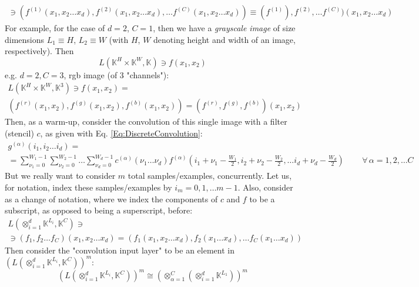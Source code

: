 \documentclass[10pt]{amsart}
\begin{document}
\begin{multicols*}{2}
\begin{equation}
\begin{gathered}
\ni (f^{(1)}(x_1,x_2 \dots x_d), f^{(2)}(x_1,x_2 \dots x_d) , \dots f^{(C)}(x_1,x_2 \dots x_d)) \equiv (f^{(1)}),f^{(2)}, \dots f^{(C)} )(x_1,x_2 \dots x_d)
\end{gathered}
\end{equation}
For example, for the case of $d=2$, $C=1$, then we have a \emph{grayscale image} of size dimensions $L_1 \equiv H$, $L_2 \equiv W$ (with $H$, $W$ denoting height and width of an image, respectively).  Then 
\[
L(\mathbb{K}^H \times \mathbb{K}^W, \mathbb{K}) \ni f(x_1,x_2)
\]
e.g. $d=2,C=3$, rgb image (of 3 "channels"):
\[
\begin{gathered}
L(\mathbb{K}^H \times \mathbb{K}^W, \mathbb{K}^3) \ni f(x_1,x_2) = \\
(f^{(r)}(x_1,x_2),f^{(g)}(x_1,x_2),f^{(b)}(x_1,x_2)) = (f^{(r)}, f^{(g)},f^{(b)})(x_1,x_2)
\end{gathered}
\]
Then, as a warm-up, consider the convolution of this single image with a filter (stencil) $c$, as given with Eq. \ref{Eq:DiscreteConvolution}:
\[
\begin{gathered}
g^{(\alpha)}(i_1,i_2 \dots i_d) = \\
= \sum_{\nu_1=0}^{W_1-1} \sum_{\nu_2=0}^{W_2-1} \dots \sum_{\nu_d=0}^{W_d-1} c^{(\alpha)}(\nu_1 \dots \nu_d ) f^{(\alpha)}(i_1 + \nu_1 - \frac{W_1}{2} , i_2 + \nu_2 - \frac{W_2}{2}, \dots i_d + \nu_d - \frac{W_d}{2}) \qquad \, \forall \, \alpha = 1, 2, \dots C
\end{gathered}
\]
But we really want to consider $m$ total samples/examples, concurrently.  Let us, for notation, index these samples/examples by $i_m = 0,1,\dots m-1$.  
Also, consider as a change of notation, where we index the components of $c$ and $f$ to be a subscript, as opposed to being a superscript, before:
\begin{equation}
\begin{gathered}
L(\otimes_{i=1}^d \mathbb{K}^{L_i}, \mathbb{K}^C) \ni \\
\ni (f_1,f_2 \dots f_C)(x_1,x_2 \dots x_d) = (f_1(x_1,x_2 \dots x_d), f_2(x_1\dots x_d), \dots f_C(x_1 \dots x_d))
\end{gathered}
\end{equation}
Then consider the "convolution input layer" to be an element in $ (L(\otimes_{i=1}^d \mathbb{K}^{L_i}, \mathbb{K}^C))^m$: 
\begin{equation}
 (L(\otimes_{i=1}^d \mathbb{K}^{L_i}, \mathbb{K}^C))^m \cong \left( \otimes_{\alpha=1}^C (\otimes_{i=1}^d \mathbb{K}^{L_1}) \right)^m
\end{equation}

\end{multicols*}
\end{document}
